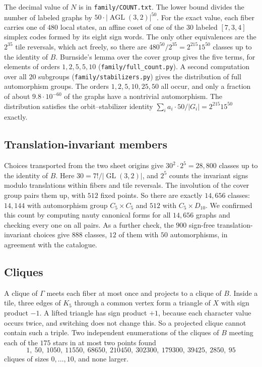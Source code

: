 \documentclass[11pt]{amsart}
\theoremstyle{remark}
\DeclareMathOperator{\AGL}{AGL}
\DeclareMathOperator{\GL}{GL}
\begin{document}
The decimal value of $N$ is in \texttt{family/COUNT.txt}. The lower bound divides the number of labeled graphs by $50\cdot|\AGL(3,2)|^{50}$. For the exact value, each fiber carries one of $480$ local states, an affine coset of one of the $30$ labeled $[7,3,4]$ simplex codes formed by its eight sign words. The only other equivalences are the $2^{35}$ tile reversals, which act freely, so there are $480^{50}/2^{35}=2^{215}15^{50}$ classes up to the identity of $B$. Burnside's lemma over the cover group gives the five terms, for elements of orders $1,2,5,5,10$ (\texttt{family/full\_count.py}). A second computation over all $20$ subgroups (\texttt{family/stabilizers.py}) gives the distribution of full automorphism groups. The orders $1,2,5,10,25,50$ all occur, and only a fraction of about $9.8\cdot10^{-60}$ of the graphs have a nontrivial automorphism. The distribution satisfies the orbit--stabilizer identity $\sum_i a_i\cdot50/|G_i|=2^{215}15^{50}$ exactly.

\subsection*{Translation-invariant members}
Choices transported from the two sheet origins give $30^2\cdot2^5=28{,}800$ classes up to the identity of $B$. Here $30=7!/|\GL(3,2)|$, and $2^5$ counts the invariant signs modulo translations within fibers and tile reversals. The involution of the cover group pairs them up, with $512$ fixed points. So there are exactly $14{,}656$ classes: $14{,}144$ with automorphism group $C_5\times C_5$ and $512$ with $C_5\times D_{10}$. We confirmed this count by computing nauty canonical forms for all $14{,}656$ graphs and checking every one on all pairs. As a further check, the $900$ sign-free translation-invariant choices give $888$ classes, $12$ of them with $50$ automorphisms, in agreement with the catalogue.

\subsection*{Cliques}
A clique of $\Gamma$ meets each fiber at most once and projects to a clique of $B$. Inside a tile, three edges of $K_5$ through a common vertex form a triangle of $X$ with sign product $-1$. A lifted triangle has sign product $+1$, because each character value occurs twice, and switching does not change this. So a projected clique cannot contain such a triple. Two independent enumerations of the cliques of $B$ meeting each of the $175$ stars in at most two points found
\[
1,\ 50,\ 1050,\ 11550,\ 68650,\ 210450,\ 302300,\ 179300,\ 39425,\ 2850,\ 95
\]
cliques of sizes $0,\dots,10$, and none larger.
\end{document}
